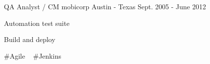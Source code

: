 \begin{cventries}
  \cventry
    {QA Analyst / CM} %
    {mobicorp} %
    {Austin - Texas} %
    {Sept. 2005 - June 2012} %
    {
      \begin{cvitems} %
        \item {Automation test suite}
        \item {Build and deploy}
      \end{cvitems}
    }
    {
      \#Agile ~
      \#Jenkins ~
    }

\end{cventries}
